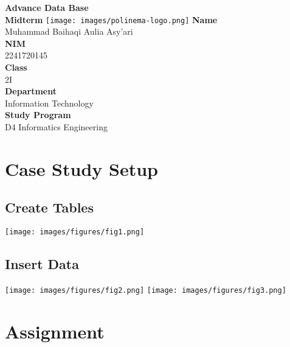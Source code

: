 \documentclass[12pt,titlepage]{article}
\newcommand{\vSubject}{Advance Data Base}
\newcommand{\vSubtitle}{Midterm}
\newcommand{\vName}{Muhammad Baihaqi Aulia Asy'ari}
\newcommand{\vNIM}{2241720145}
\newcommand{\vClass}{2I}
\newcommand{\vDepartment}{Information Technology}
\newcommand{\vStudyProgram}{D4 Informatics Engineering}
\begin{document}
\begin{titlepage}
    \centering
    \vfill
    {\bfseries\LARGE
        \vSubject\\
        \vskip0.25cm
        \vSubtitle
    }
    \vfill
    \texttt{[image: images/polinema-logo.png]}
    \vfill
    {
        \textbf{Name}\\
        \vName\\
        \vskip0.5cm
        \textbf{NIM}\\
        \vNIM\\
        \vskip0.5cm
        \textbf{Class}\\
        \vClass\\
        \vskip0.5cm
        \textbf{Department}\\
        \vDepartment\\
        \vskip0.5cm
        \textbf{Study Program}\\
        \vStudyProgram
    }
\end{titlepage}

\newpage

\section{Case Study Setup}

\subsection{Create Tables}
\begin{center}
    \texttt{[image: images/figures/fig1.png]}
\end{center}

\subsection{Insert Data}
\begin{center}
    \texttt{[image: images/figures/fig2.png]}
    \texttt{[image: images/figures/fig3.png]}
\end{center}

\section{Assignment}
\end{document}
